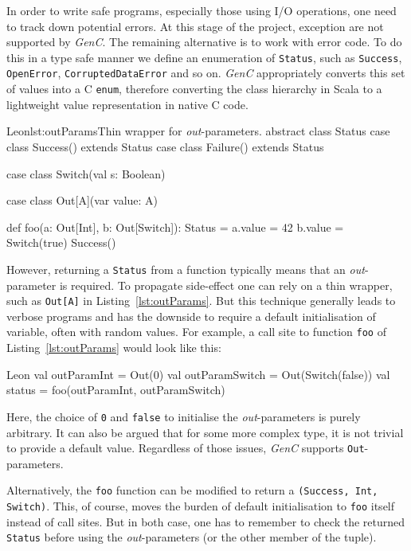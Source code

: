 \documentclass[a4paper,twoside]{article}
\newcommand{\InlineC}[1]{\lstinline[language=C99]|#1|}
\newcommand{\InlineS}[1]{\lstinline[language=Leon]|#1|}
\newcommand{\GenC}{\emph{GenC}\xspace}
\newcommand{\RefCode}[1]{Listing~\ref{#1}}
\begin{document}
In order to write safe programs, especially those using I/O operations, one need
to track down potential errors. At this stage of the project, exception are not
supported by \GenC. The remaining alternative is to work with error code. To do
this in a type safe manner we define an enumeration of \InlineS{Status}, such as
\InlineS{Success}, \InlineS{OpenError}, \InlineS{CorruptedDataError} and so on.
\GenC appropriately converts this set of values into a C \InlineC{enum},
therefore converting the class hierarchy in Scala to a lightweight value
representation in native C code.

\begin{Code}{Leon}{lst:outParams}{Thin wrapper for \emph{out}-parameters.}
abstract class Status
case class Success() extends Status
case class Failure() extends Status

case class Switch(val s: Boolean)

case class Out[A](var value: A)

def foo(a: Out[Int], b: Out[Switch]): Status = {
  a.value = 42
  b.value = Switch(true)
  Success()
}
\end{Code}

However, returning a \InlineS{Status} from a function typically means that an
\emph{out}-parameter is required. To propagate side-effect one can rely on a
thin wrapper, such as \InlineS{Out[A]} in \RefCode{lst:outParams}. But this
technique generally leads to verbose programs and has the downside to require a
default initialisation of variable, often with random values. For example,
a call site to function \InlineS{foo} of \RefCode{lst:outParams} would look like
this:

\pagebreak
\begin{ShortCode}{Leon}
val outParamInt = Out(0)
val outParamSwitch = Out(Switch(false))
val status = foo(outParamInt, outParamSwitch)
\end{ShortCode}

Here, the choice of \InlineS{0} and \InlineS{false} to initialise the
\emph{out}-parameters is purely arbitrary. It can also be argued that for some
more complex type, it is not trivial to provide a default value. Regardless of
those issues, \GenC supports \InlineS{Out}-parameters.

Alternatively, the \InlineS{foo} function can be modified to return a
\InlineS{(Success, Int, Switch)}. This, of course, moves the burden of default
initialisation to \InlineS{foo} itself instead of call sites. But in both case,
one has to remember to check the returned \InlineS{Status} before using the
\emph{out}-parameters (or the other member of the tuple).
\end{document}
